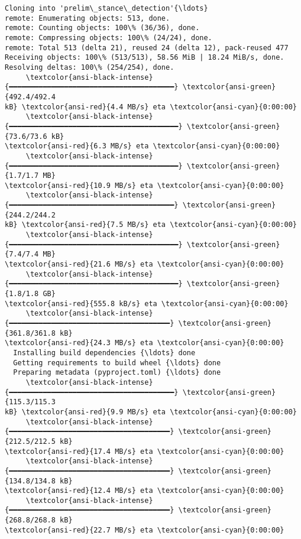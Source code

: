 \documentclass[11pt]{article}
\begin{document}
    \begin{Verbatim}[commandchars=\\\{\}]
Cloning into 'prelim\_stance\_detection'{\ldots}
remote: Enumerating objects: 513, done.
remote: Counting objects: 100\% (36/36), done.
remote: Compressing objects: 100\% (24/24), done.
remote: Total 513 (delta 21), reused 24 (delta 12), pack-reused 477
Receiving objects: 100\% (513/513), 58.56 MiB | 18.24 MiB/s, done.
Resolving deltas: 100\% (254/254), done.
     \textcolor{ansi-black-intense}{━━━━━━━━━━━━━━━━━━━━━━━━━━━━━━━━━━━━━━━} \textcolor{ansi-green}{492.4/492.4
kB} \textcolor{ansi-red}{4.4 MB/s} eta \textcolor{ansi-cyan}{0:00:00}
     \textcolor{ansi-black-intense}{━━━━━━━━━━━━━━━━━━━━━━━━━━━━━━━━━━━━━━━━} \textcolor{ansi-green}{73.6/73.6 kB}
\textcolor{ansi-red}{6.3 MB/s} eta \textcolor{ansi-cyan}{0:00:00}
     \textcolor{ansi-black-intense}{━━━━━━━━━━━━━━━━━━━━━━━━━━━━━━━━━━━━━━━━} \textcolor{ansi-green}{1.7/1.7 MB}
\textcolor{ansi-red}{10.9 MB/s} eta \textcolor{ansi-cyan}{0:00:00}
     \textcolor{ansi-black-intense}{━━━━━━━━━━━━━━━━━━━━━━━━━━━━━━━━━━━━━━━} \textcolor{ansi-green}{244.2/244.2
kB} \textcolor{ansi-red}{7.5 MB/s} eta \textcolor{ansi-cyan}{0:00:00}
     \textcolor{ansi-black-intense}{━━━━━━━━━━━━━━━━━━━━━━━━━━━━━━━━━━━━━━━━} \textcolor{ansi-green}{7.4/7.4 MB}
\textcolor{ansi-red}{21.6 MB/s} eta \textcolor{ansi-cyan}{0:00:00}
     \textcolor{ansi-black-intense}{━━━━━━━━━━━━━━━━━━━━━━━━━━━━━━━━━━━━━━━━} \textcolor{ansi-green}{1.8/1.8 GB}
\textcolor{ansi-red}{555.8 kB/s} eta \textcolor{ansi-cyan}{0:00:00}
     \textcolor{ansi-black-intense}{━━━━━━━━━━━━━━━━━━━━━━━━━━━━━━━━━━━━━━} \textcolor{ansi-green}{361.8/361.8 kB}
\textcolor{ansi-red}{24.3 MB/s} eta \textcolor{ansi-cyan}{0:00:00}
  Installing build dependencies {\ldots} done
  Getting requirements to build wheel {\ldots} done
  Preparing metadata (pyproject.toml) {\ldots} done
     \textcolor{ansi-black-intense}{━━━━━━━━━━━━━━━━━━━━━━━━━━━━━━━━━━━━━━━} \textcolor{ansi-green}{115.3/115.3
kB} \textcolor{ansi-red}{9.9 MB/s} eta \textcolor{ansi-cyan}{0:00:00}
     \textcolor{ansi-black-intense}{━━━━━━━━━━━━━━━━━━━━━━━━━━━━━━━━━━━━━━} \textcolor{ansi-green}{212.5/212.5 kB}
\textcolor{ansi-red}{17.4 MB/s} eta \textcolor{ansi-cyan}{0:00:00}
     \textcolor{ansi-black-intense}{━━━━━━━━━━━━━━━━━━━━━━━━━━━━━━━━━━━━━━} \textcolor{ansi-green}{134.8/134.8 kB}
\textcolor{ansi-red}{12.4 MB/s} eta \textcolor{ansi-cyan}{0:00:00}
     \textcolor{ansi-black-intense}{━━━━━━━━━━━━━━━━━━━━━━━━━━━━━━━━━━━━━━} \textcolor{ansi-green}{268.8/268.8 kB}
\textcolor{ansi-red}{22.7 MB/s} eta \textcolor{ansi-cyan}{0:00:00}

\end{Verbatim}
\end{document}
